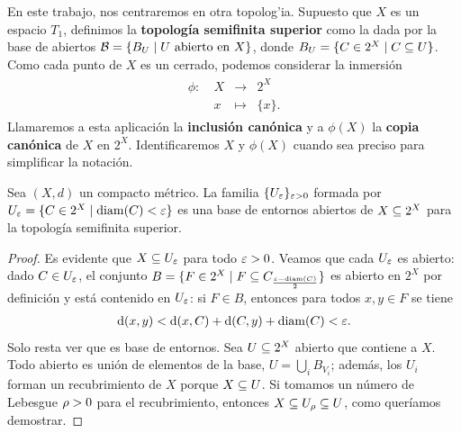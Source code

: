En este trabajo, nos centraremos en otra topolog'ia. Supuesto que $X$ es un espacio $T_1$, definimos la \textbf{topología semifinita superior} como la dada por la base de abiertos $ \mathcal{B} = \{B_U\mid U\text{ abierto en } X \} $, donde $ B_U = \{C\in 2^X \mid C\subseteq U \}$. Como cada punto de $ X  $ es un cerrado, podemos considerar la inmersión 
\begin{gather*}
  \begin{matrix}
  \phi: \ &X  &\longrightarrow &2^X  \\
  &x  &\mapsto &\{x \}.
  \end{matrix}
\end{gather*}
Llamaremos a esta aplicación la \textbf{inclusión canónica} y a $ \phi(X) $ la \textbf{copia canónica} de $ X  $ en $ 2^X  $. Identificaremos $ X  $ y $ \phi(X) $ cuando sea preciso para simplificar la notación.

\begin{proposition}
  Sea $ (X,d) $ un compacto métrico. La familia $ \{U_\varepsilon \}_{\varepsilon> 0 } $ formada por $ U_\varepsilon = \{C\in 2^X \mid \operatorname{diam}(C)<\varepsilon \} $ es una base de entornos abiertos de $ X\subseteq 2^X   $ para la topología semifinita superior.
\end{proposition}
\begin{proof}
  Es evidente que $ X\subseteq U_\varepsilon$ para todo $ \varepsilon>0  $. Veamos que cada $ U_\varepsilon  $ es abierto: dado $ C\in U_\varepsilon  $, el conjunto $ B = \{F\in 2^X \mid F\subseteq C_{\frac{\varepsilon-\operatorname{diam}(C)}{2}}\} $ es abierto en $ 2^X  $ por definición y está contenido en $ U_\varepsilon $: si $ F\in B  $, entonces para todos $ x, y\in F$ se tiene 
  \begin{gather*}
    \dd(x,y)<\dd(x,C)+\dd(C,y)+\operatorname{diam}(C) <\varepsilon.
  \end{gather*}
  Solo resta ver que es base de entornos. Sea $ U \subseteq 2^X $ abierto que contiene a $ X  $. Todo abierto es unión de elementos de la base, $ U = \bigcup_i B_{V_i } $; además, los $ U_i  $ forman un recubrimiento de $ X  $ porque $ X\subseteq U  $. Si tomamos un número de Lebesgue $ \rho>0  $ para el recubrimiento, entonces $ X\subseteq U_\rho\subseteq U  $, como queríamos demostrar.
\end{proof}

